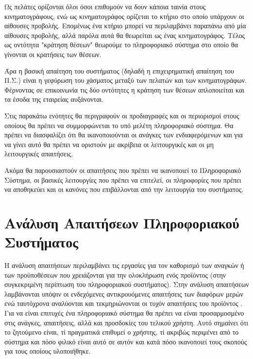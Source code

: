 \documentclass{assignment}
\begin{document}
Ως πελάτες ορίζονται όλοι όσοι επιθυμούν να δουν κάποια ταινία στους κινηματογράφους, ενώ ως κινηματογράφος ορίζεται το κτήριο στο οποίο υπάρχουν οι αίθουσες προβολής. Επομένως ένα κτήριο μπορεί να περιλαμβάνει παραπάνω από μία αίθουσες προβολής, αλλά παρόλα αυτά θα θεωρείται ως ένας κινηματογράφος. Τέλος ως οντότητα "κράτηση θέσεων" θεωρούμε το πληροφοριακό σύστημα στο οποίο θα γίνονται οι κρατήσεις των θέσεων.

Άρα η βασική απαίτηση του συστήματος (δηλαδή η επιχειρηματική απαίτηση του Π.Σ.) είναι η γεφύρωση του χάσματος μεταξύ των πελατών και των κινηματογράφων. Φέρνοντας σε επικοινωνία τις δύο οντότητες η κράτηση των θέσεων απλοποιείται και τα έσοδα της εταιρείας αυξάνονται.

Στις παρακάτω ενότητες θα περιγραφούν οι προδιαγραφές και οι περιορισμοί στους οποίους θα πρέπει να συμμορφώνεται το υπό μελέτη πληροφοριακό σύστημα. Θα πρέπει να διασφαλίζει ότι θα ικανοποιούνται οι ανάγκες των ενδιαφερόμενων και για να γίνει αυτό θα πρέπει να οριστούν με ακρίβεια οι λειτουργικές και οι μη λειτουργικές απαιτήσεις.

Ακόμα θα παρουσιαστούν οι απαιτήσεις που πρέπει να ικανοποιεί το Πληροφοριακό Σύστημα, οι βασικές λειτουργίες που πρέπει να επιτελεί, οι πληροφορίες που πρέπει να αποθηκεύει και οι κανόνες που επιβάλλονται από την λειτουργία του συστήματος.



\section{Ανάλυση Απαιτήσεων Πληροφοριακού Συστήματος}

Η ανάλυση απαιτήσεων περιλαμβάνει τις εργασίες για τον καθορισμό των αναγκών ή των προϋποθέσεων που χρειάζονται για την ολοκλήρωση ενός προϊόντος (στην συγκεκριμένη περίπτωση του πληροφοριακού συστήματος). Στην ανάλυση απαιτήσεων λαμβάνονται υπόψιν οι ενδεχόμενες αντικρουόμενες απαιτήσεις των διαφόρων μερών ενώ ταυτόχρονα αναλύονται και τεκμηριώνονται οι τυχόν απαιτήσεις του προϊόντος \cite{wiki:requirement_analysis}. Για να είναι επιτυχές ένα πληροφοριακό σύστημα θα πρέπει να είναι προσαρμοσμένο στις ανάγκες, απαιτήσεις, αλλά και προσδοκίες του τελικού χρήστη. Αυτό σημαίνει ότι το ζητούμενο είναι, τί πραγματικά επιθυμεί ο χρήστης, τί ακριβώς περιμένει από το σύστημα και πόσο φιλικό είναι αυτό σε αυτόν και κατά πόσο ικανοποιεί τους σκοπούς για τους οποίους υλοποιήθηκε.  
\end{document}
